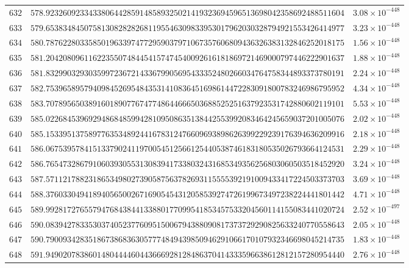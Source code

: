 \documentclass[12pt,reqno]{amsart}
\theoremstyle{remark}
\begin{document}
\begin{longtable}{clc}
$632$ & $578.9232609233433806442859148589325021419323694596513698042358692488511604$ & $3.08\times 10^{-448}$ \\
$633$ & $579.6538348450758130828282681195546309833953017962030328794921553426414977$ & $3.23\times 10^{-448}$ \\
$634$ & $580.7876228033585019633974772959037971067357606809436326383132846252018175$ & $1.56\times 10^{-448}$ \\
$635$ & $581.2042080961162235507484454157474540092616181869721469000797446222901637$ & $1.88\times 10^{-448}$ \\
$636$ & $581.8329903293035997236721433679905695433352480266034764758344893373780191$ & $2.24\times 10^{-448}$ \\
$637$ & $582.7539658957940984526954843531410836451698614472283091800783246986795952$ & $4.34\times 10^{-448}$ \\
$638$ & $583.7078956503891601890776747748644666503688525251637923531742880602119101$ & $5.53\times 10^{-448}$ \\
$639$ & $585.0226845396929486848599428109508635138442553992083464245659037201005076$ & $2.02\times 10^{-448}$ \\
$640$ & $585.1533951375897763534892441678312476609693898626399229239176394636209916$ & $2.18\times 10^{-448}$ \\
$641$ & $586.0675395784151337902411970054512566125440538746183180535026793664124531$ & $2.29\times 10^{-448}$ \\
$642$ & $586.7654732867910603930553130839417338032431685349356256803060503518452920$ & $3.24\times 10^{-448}$ \\
$643$ & $587.5711217882318653498027390587563782693115555392191009433417224503373703$ & $3.69\times 10^{-448}$ \\
$644$ & $588.3760330494189405650026716905454312058539274726199673497238224441801442$ & $4.71\times 10^{-448}$ \\
$645$ & $589.9928172765579476843844133880177099541853457533204560114155083441020724$ & $2.52\times 10^{-497}$ \\
$646$ & $590.0839427833530374052377609515006794388090817373729290825633240770558643$ & $2.05\times 10^{-448}$ \\
$647$ & $590.7900934283518673868363057774849439850946291066170107932346698045214735$ & $1.83\times 10^{-448}$ \\
$648$ & $591.9490207838601480444460443666928128486370414333596638612812157280954440$ & $2.76\times 10^{-448}$ \\

\end{longtable}
\end{document}
